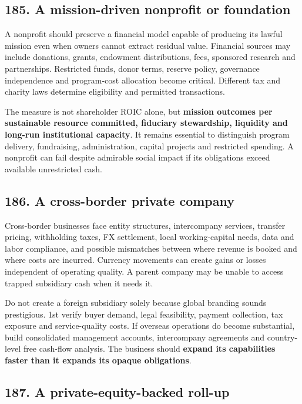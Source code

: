 \subsection{185. A mission-driven nonprofit or foundation}


A nonprofit should preserve a financial model capable of producing its lawful mission even when owners cannot extract residual value. Financial sources may include donations, grants, endowment distributions, fees, sponsored research and partnerships. Restricted funds, donor terms, reserve policy, governance independence and program-cost allocation become critical. Different tax and charity laws determine eligibility and permitted transactions.

The measure is not shareholder ROIC alone, but \textbf{mission outcomes per sustainable resource committed, fiduciary stewardship, liquidity and long-run institutional capacity}. It remains essential to distinguish program delivery, fundraising, administration, capital projects and restricted spending. A nonprofit can fail despite admirable social impact if its obligations exceed available unrestricted cash.

\subsection{186. A cross-border private company}


Cross-border businesses face entity structures, intercompany services, transfer pricing, withholding taxes, FX settlement, local working-capital needs, data and labor compliance, and possible mismatches between where revenue is booked and where costs are incurred. Currency movements can create gains or losses independent of operating quality. A parent company may be unable to access trapped subsidiary cash when it needs it.

Do not create a foreign subsidiary solely because global branding sounds prestigious. 1st verify buyer demand, legal feasibility, payment collection, tax exposure and service-quality costs. If overseas operations do become substantial, build consolidated management accounts, intercompany agreements and country-level free cash-flow analysis. The business should \textbf{expand its capabilities faster than it expands its opaque obligations}.

\subsection{187. A private-equity-backed roll-up}


